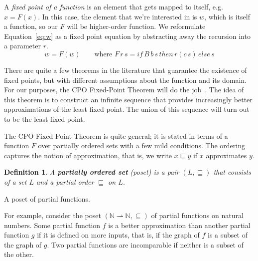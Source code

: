 \documentclass{tufte-handout}
\newtheorem{definition}{Definition}%
\begin{document}
A \emph{fixed point of a function} is an element that gets mapped to
itself, e.g. $x = F(x)$. In this case, the element that we're
interested in is $w$, which is itself a function, so our $F$ will be
higher-order function. We reformulate Equation~\ref{eq:w} as a fixed
point equation by abstracting away the recursion into a parameter $r$.
\begin{equation} \label{eq:while}
  w = F(w)
  \qquad
  \text{where }
  F\,r\,s = \mathit{if}\, B\,b\,s \,\mathit{then}\, r(c\,s)\,\mathit{else}\,s
\end{equation}

There are quite a few theorems in the literature that guarantee the
existence of fixed points, but with different assumptions about the
function and its domain. For our purposes, the CPO Fixed-Point Theorem
will do the job~\citep{Lassez:1982aa}. The idea of this theorem is to
construct an infinite sequence that provides increasingly better
approximations of the least fixed point. The union of this sequence
will turn out to be the least fixed point.

The CPO Fixed-Point Theorem is quite general; it is stated in terms of
a function $F$ over partially ordered sets with a few mild conditions.
The ordering captures the notion of approximation, that is, we write
$x \sqsubseteq y$ if $x$ approximates $y$.

\begin{definition}
  A \textbf{\emph{partially ordered set}} (poset) is a pair
  $(L,\sqsubseteq)$ that consists of a set $L$ and a partial order
  $\sqsubseteq$ on $L$.
\end{definition}

\begin{marginfigure}
\centering\large
{}
\caption{A poset of partial functions.}
\label{fig:poset-of-partial-functions}
\end{marginfigure}
%
For example, consider the poset
$(\mathbb{N}{\rightharpoonup}\mathbb{N}, \subseteq)$ of partial
functions on natural numbers. Some partial function $f$ is a better
approximation than another partial function $g$ if it is defined on
more inputs, that is, if the graph of $f$ is a subset of the graph of
$g$.  Two partial functions are incomparable if neither is a subset of
the other.
\end{document}
